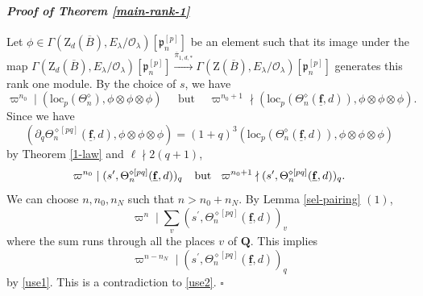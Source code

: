 \documentclass[10pt]{amsart}
\numberwithin{equation}{section}
\theoremstyle{plain}
\numberwithin{equation}{section}
\theoremstyle{definition}
\theoremstyle{remark}
\newenvironment{myproof}[2] {\paragraph{\emph{Proof of {#1} {#2} }}}{\hfill$\square$}
\def\loc{\mathrm{loc}}
\def\triplef{\underline{\mathbf{f}}}
\def\calO{\mathcal{O}}
\def\frakp{\mathfrak{p}}
\def\QQ{\mathbf{Q}}
\def\rmZ{\mathrm{Z}}
\begin{document}
\begin{myproof}{Theorem}{\ref{main-rank-1}}
Let  $\phi\in  \Gamma(\rmZ_{d}(\overline{B}),E_{\lambda}/\calO_{\lambda})[\frakp^{[p]}_{n}]$ be an element such that its image 
under the map $\Gamma(\rmZ_{d}(\overline{B}),E_{\lambda}/\calO_{\lambda})[\frakp^{[p]}_{n}]\xrightarrow{\overline{\pi}_{1,d,\ast}} \Gamma(\rmZ(\overline{B}),E_{\lambda}/\calO_{\lambda})[\frakp^{[p]}_{n}]$
generates this rank one module.  By the choice of $s$, we have 
\begin{equation*}
\varpi^{n_{0}}\mid (\loc_{p}(\Theta^{\diamond}_{n}), \phi\otimes\phi\otimes\phi) \phantom{aa}\text{ but }\phantom{bb} \varpi^{n_{0}+1}\nmid (\loc_{p}(\Theta^{\diamond}_{n}(\triplef,d)), \phi\otimes\phi\otimes\phi).
\end{equation*}
Since we have
\begin{equation*} 
(\partial_{q}\Theta^{\diamond [pq]}_{n}(\triplef,d), \phi\otimes \phi\otimes \phi)
=(1+q)^{3}(\loc_{p}(\Theta^{\diamond}_{n}(\triplef,d)), \phi\otimes\phi\otimes\phi) 
\end{equation*}
by Theorem \ref{1-law} and $\ell\nmid 2(q+1)$, 
\begin{equation}\label{use2}
\varpi^{n_{0}}\mid(s^{\prime}, \Theta^{\diamond[pq]}_{n}(\triplef,d))_{q} \hphantom{aa}\text{but}\hphantom{bb} \varpi^{n_{0}+1}\nmid(s^{\prime}, \Theta^{\diamond[pq]}_{n}(\triplef,d))_{q}.
\end{equation}
We can choose $n, n_{0}, n_{N}$ such that $n> n_{0}+n_{N}$. By Lemma \ref{sel-pairing} $(1)$, 
\begin{equation*}
\varpi^{n}\mid \sum_{v}(s^{\prime}, \Theta^{\diamond[pq]}_{n}(\triplef,d))_{v}
\end{equation*}
where the sum runs through all the places $v$ of $\QQ$. This implies 
\begin{equation*}
\varpi^{n-n_{N}}\mid(s^{\prime}, \Theta^{\diamond[pq]}_{n}(\triplef,d))_{q} 
\end{equation*}
by \eqref{use1}. This is a contradiction to \eqref{use2}.
\end{myproof}
\end{document}
